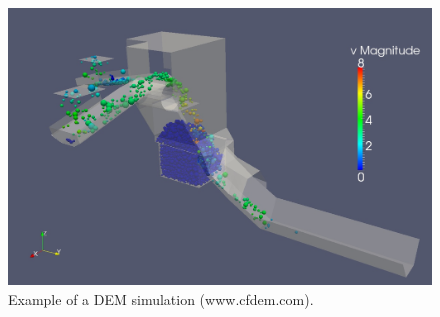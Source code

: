 \begin{figure}[!htb]
\centering
\includegraphics[width=.70\columnwidth]{images/061cfdemsim}
\caption[DEM simulation]{Example of a DEM simulation (www.cfdem.com).}
\label{fig:061cfdemsim}
\end{figure}